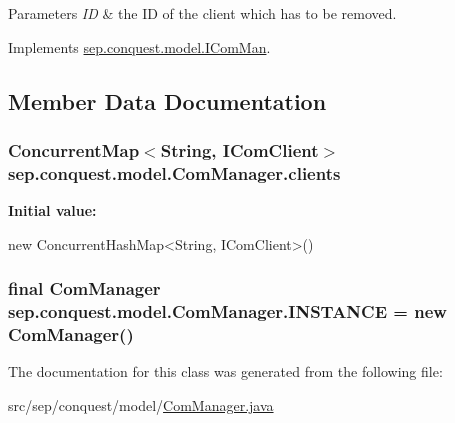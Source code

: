 \begin{DoxyParams}{Parameters}
{\em ID} & the ID of the client which has to be removed. \\
\hline
\end{DoxyParams}


Implements \hyperlink{interfacesep_1_1conquest_1_1model_1_1_i_com_man_a275bd938fd5fde4cf99c302c5ae5b85b}{sep.conquest.model.IComMan}.



\subsection{Member Data Documentation}
\hypertarget{classsep_1_1conquest_1_1model_1_1_com_manager_abf9f5b6006505c5b6c24aed64fd21a93}{
\subsubsection[{clients}]{\setlength{\rightskip}{0pt plus 5cm}ConcurrentMap$<$String, {\bf IComClient}$>$ {\bf sep.conquest.model.ComManager.clients}}}
\label{classsep_1_1conquest_1_1model_1_1_com_manager_abf9f5b6006505c5b6c24aed64fd21a93}
{\bfseries Initial value:}
\begin{DoxyCode}
 
        new ConcurrentHashMap<String, IComClient>()
\end{DoxyCode}
\hypertarget{classsep_1_1conquest_1_1model_1_1_com_manager_acc2236ac5d69116e7b91d7add3699da7}{
\subsubsection[{INSTANCE}]{\setlength{\rightskip}{0pt plus 5cm}final {\bf ComManager} {\bf sep.conquest.model.ComManager.INSTANCE} = new {\bf ComManager}()}}
\label{classsep_1_1conquest_1_1model_1_1_com_manager_acc2236ac5d69116e7b91d7add3699da7}


The documentation for this class was generated from the following file:\begin{DoxyCompactItemize}
\item 
src/sep/conquest/model/\hyperlink{_com_manager_8java}{ComManager.java}\end{DoxyCompactItemize}
